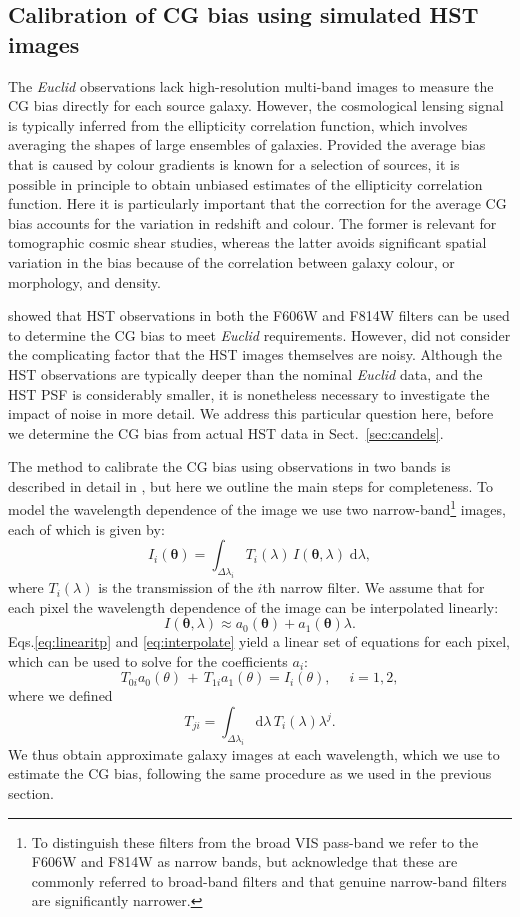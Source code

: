 \documentclass[useAMS,usenatbib]{mnras}
\renewcommand{\d}{\mathrm{d}}
\newcommand{\be}{\begin{equation}}
\newcommand{\ee}{\end{equation}}
\def\elabel#1{\label{eq:#1}}
\begin{document}
\subsection{Calibration of CG bias using simulated HST images}
\label{sec:noisy}

The {\it Euclid} observations lack high-resolution multi-band images to measure the CG bias directly for each source galaxy. However, the cosmological lensing signal is typically inferred from the ellipticity correlation function, which involves  averaging the shapes of large ensembles of galaxies. Provided the average bias that is caused by colour gradients is known for a selection of sources, it is possible in principle to obtain unbiased estimates of the ellipticity correlation function. Here it is particularly important that the correction for the average CG bias accounts for the variation in redshift
and colour. The former is relevant for tomographic cosmic shear studies, whereas the latter avoids
significant spatial variation in the bias because of the correlation between galaxy colour, or morphology, and density.

 showed that HST observations  in both the F606W and F814W filters can be used to determine the CG bias to meet {\it Euclid} requirements. However,  did not consider the complicating factor that the HST images themselves are noisy. Although the HST observations are typically deeper than the nominal {\it Euclid} data, and the HST PSF is considerably smaller, it is nonetheless necessary to investigate the impact of noise in more detail. We address this particular question here, before we determine the CG bias from actual HST data in Sect.~\ref{sec:candels}.

The method to calibrate the CG bias using observations in two bands is described in detail
in , but here we outline the main steps for completeness. To model the
wavelength dependence of the image we use two narrow-band\footnote{To distinguish these filters from the broad VIS pass-band we refer to the F606W and F814W as narrow bands, but acknowledge that these are commonly referred to broad-band filters and that genuine narrow-band filters are significantly narrower.} images, each of which is given by:
%
\be
I_i({\bm\theta}) = \int_{\Delta \lambda_i} T_i(\lambda)\, I({\bm \theta},\lambda) \;\d \lambda,
\elabel{linearitp}
\ee
%
where $T_i(\lambda)$ is the transmission of the $i$th narrow filter. We assume that for each pixel the wavelength dependence of the image can be interpolated linearly:
%
\be
I({\bm \theta},\lambda) \approx  a_0({\bm \theta})+a_1({\bm \theta})\lambda.
\elabel{interpolate}
\ee
%
Eqs.\ref{eq:linearitp} and \ref{eq:interpolate} yield a linear set of
equations for each pixel, which can be used to solve for the
coefficients $a_i$:
%
\be
T_{0i} a_0(\theta) \,+\,T_{1i} a_1(\theta) = I_i(\theta), \quad\; i=1,2,
\elabel{lineareq}
\ee
%
where we defined
\be
T_{ji}=\int_{\Delta\lambda_i} \d \lambda\,T_i(\lambda)\lambda^j.
\ee
%
We thus obtain approximate galaxy images at each wavelength, which we use to estimate the CG bias, following the same procedure as we used in the previous section.
\end{document}
